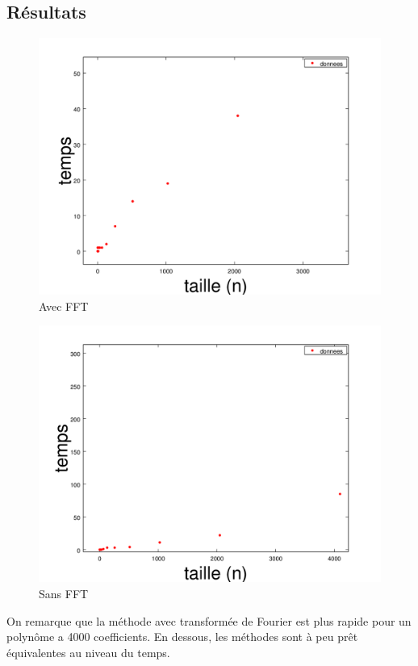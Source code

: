 \documentclass{article}
\begin{document}
\subsection{Résultats}

\begin{figure}
	\begin{center}
		\includegraphics[scale=0.5]{FFTSmall}\\
		Avec FFT
	\end{center}
\end{figure}
\begin{figure}
	\begin{center}
		\includegraphics[scale=0.5]{NoFFTSmall}\\
		Sans FFT
	\end{center}
\end{figure}
On remarque que la méthode avec transformée de Fourier est plus rapide pour un polynôme a 4000 coefficients. En dessous, les méthodes sont à peu prêt équivalentes au niveau du temps.
\end{document}

